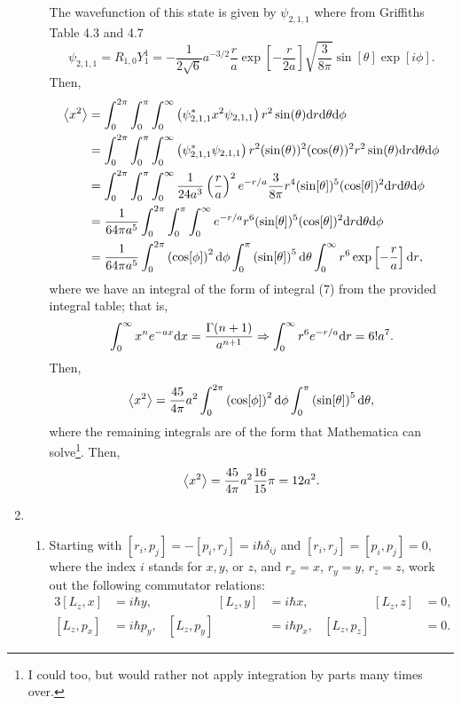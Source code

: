 \documentclass[a4paper, 12pt]{config/homework}
\begin{document}
\begin{enumerate}
\begin{enumerate}[label=(\alph*)]
The wavefunction of this state is given by \(\psi_{2,1,1}\) where from Griffiths Table 4.3 and 4.7
\[\psi_{2,1,1} = R_{1,0}Y_1^1 = -\frac{1}{2\sqrt{6}}a^{-3/2}\frac{r}{a}\exp\left[-\frac{r}{2a}\right]\sqrt{\frac{3}{8\pi}}\sin[\theta]\exp\left[i\phi\right].\]
Then,
\begin{align*}
\left\langle x^2 \right\rangle &= \int_{0}^{2\pi}{\int_{0}^{\pi}{\int_{0}^{\infty}{
    \left(\psi_{2,1,1}^* x^2 \psi_{2,1,1}\right) r^2\sin(\theta)
 \text{d}r} \text{d}\theta} \text{d}\phi}
\\&= \int_{0}^{2\pi}{\int_{0}^{\pi}{\int_{0}^{\infty}{
    \left(\psi_{2,1,1}^* \psi_{2,1,1}\right) r^2(\sin(\theta))^2(\cos(\theta))^2r^2\sin(\theta)
 \text{d}r} \text{d}\theta} \text{d}\phi}
\\&= \int_{0}^{2\pi}{\int_{0}^{\pi}{\int_{0}^{\infty}{
    \frac{1}{24a^3}\left(\frac{r}{a}\right)^2e^{-r/a}\frac{3}{8\pi} r^4(\sin[\theta])^5(\cos[\theta])^2
 \text{d}r} \text{d}\theta} \text{d}\phi}
\\&= \frac{1}{64\pi a^5} \int_{0}^{2\pi}{\int_{0}^{\pi}{\int_{0}^{\infty}{
    e^{-r/a} r^6 (\sin[\theta])^5 (\cos[\theta])^2
 \text{d}r} \text{d}\theta} \text{d}\phi}
\\&= \frac{1}{64\pi a^5}
\int_{0}^{2\pi}{\left(\cos[\phi]\right)^2 \text{d}\phi}
\int_{0}^{\pi}{\left(\sin[\theta]\right)^5 \text{d}\theta}
\int_{0}^{\infty}{r^6\exp\left[-\frac{r}{a}\right] \text{d}r},
\end{align*}
where we have an integral of the form of integral (7) from the provided integral table; that is,
\[\int_{0}^{\infty}{x^n e^{-ax} \text{d}x}=\frac{\Gamma(n+1)}{a^{n+1}}
\Rightarrow \int_{0}^{\infty}{r^{6} e^{-r/a} \text{d}r} = 6! a^7.\]
Then,
\[\left\langle x^2 \right\rangle = \frac{45}{4\pi}a^2 \int_{0}^{2\pi}{\left(\cos[\phi]\right)^2 \text{d}\phi}
\int_{0}^{\pi}{\left(\sin[\theta]\right)^5 \text{d}\theta},\]
where the remaining integrals are of the form that Mathematica can solve\footnote{I could too, but would rather not apply integration by parts many times over.}.
Then,
\[\left\langle x^2 \right\rangle = \frac{45}{4\pi}a^2 \frac{16}{15} \pi = 12 a^2.\]

\end{enumerate}
\pagebreak
\item \begin{enumerate}[label=(\alph*)]
\item Starting with \([r_i,p_j]=-[p_i,r_j]=i\hbar\delta_{ij}\) and \([r_i,r_j]=[p_i,p_j]=0\), where the index \(i\) stands for \(x,y\), or \(z\), and \(r_x=x\), \(r_y=y\), \(r_z=z\), work out the following commutator relations:
\begin{alignat*}{3}
[L_z,x] & =i\hbar y, & \qquad\qquad [L_z,y] & =i\hbar x, & \qquad\qquad [L_z,z] & =0, \\
[L_z,p_x]&=i\hbar p_y, & [L_z, p_y]&=i\hbar p_x, & [L_z, p_z]&=0.
\end{alignat*} \bigskip




\end{enumerate}
\end{enumerate}
\end{document}
